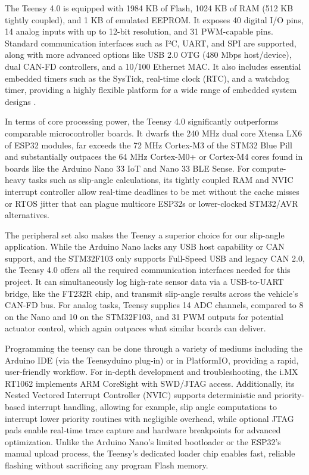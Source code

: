 \documentclass[12pt]{article}
\begin{document}
            The Teensy 4.0 is equipped with 1984 KB of Flash, 1024 KB of RAM (512 KB tightly coupled), and 1 KB of emulated EEPROM. It exposes 40 digital 
            I/O pins, 14 analog inputs with up to 12-bit resolution, and 31 PWM-capable pins. Standard communication interfaces such as I²C, UART, and SPI 
            are supported, along with more advanced options like USB 2.0 OTG (480 Mbps host/device), dual CAN-FD controllers, and a 10/100 Ethernet MAC. It 
            also includes essential embedded timers such as the SysTick, real-time clock (RTC), and a watchdog timer, providing a highly flexible platform 
            for a wide range of embedded system designs \autocite{PJRC}.

            In terms of core processing power, the Teensy 4.0 significantly outperforms comparable microcontroller boards. It dwarfs the 240 MHz dual core 
            Xtensa LX6 of ESP32 modules, far exceeds the 72 MHz Cortex-M3 of the STM32 Blue Pill and substantially outpaces the 64 MHz Cortex-M0+ or Cortex-M4 
            cores found in boards like the Arduino Nano 33 IoT and Nano 33 BLE Sense. For compute-heavy tasks such as slip-angle calculations, its tightly 
            coupled RAM and NVIC interrupt controller allow real-time deadlines to be met without the cache misses or RTOS jitter that can plague multicore 
            ESP32s or lower-clocked STM32/AVR alternatives. 

            The peripheral set also makes the Teensy a superior choice for our slip-angle application. While the Arduino Nano lacks any USB host capability or 
            CAN support, and the STM32F103 only supports Full-Speed USB and legacy CAN 2.0, the Teensy 4.0 offers all the required communication interfaces 
            needed for this project. It can simultaneously log high-rate sensor data via a USB-to-UART bridge, like the FT232R chip, and transmit slip-angle 
            results across the vehicle’s CAN-FD bus. For analog tasks, Teensy supplies 14 ADC channels, compared to 8 on the Nano and 10 on the STM32F103, 
            and 31 PWM outputs for potential actuator control, which again outpaces what similar boards can deliver.

            Programming the teensy can be done through a variety of mediums including the Arduino IDE (via the Teensyduino plug‑in) or in PlatformIO, providing 
            a rapid, user‑friendly workflow. For in‑depth development and troubleshooting, the i.MX RT1062 implements ARM CoreSight with SWD/JTAG access. 
            Additionally, its Nested Vectored Interrupt Controller (NVIC) supports deterministic and priority-based interrupt handling, allowing for example, 
            slip angle computations to interrupt lower priority routines with negligible overhead, while optional JTAG pads enable real‑time trace capture and 
            hardware breakpoints for advanced optimization. Unlike the Arduino Nano’s limited bootloader or the ESP32’s manual upload process, the Teensy’s 
            dedicated loader chip enables fast, reliable flashing without sacrificing any program Flash memory.
\end{document}
